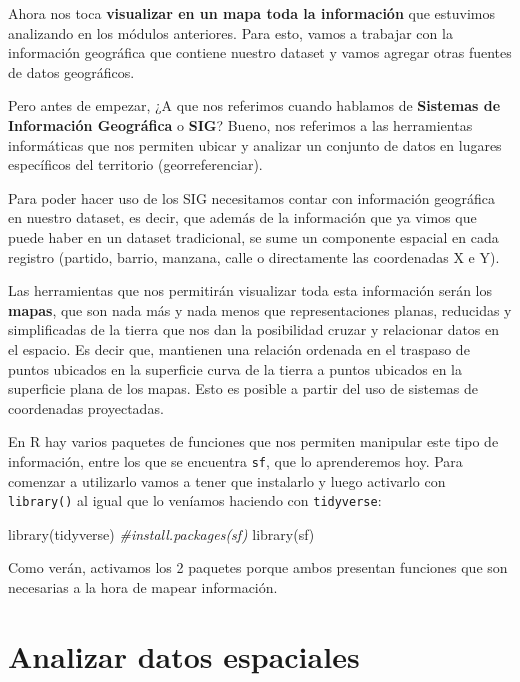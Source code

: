 \documentclass[
  spanish,
]{book}
\newenvironment{Shaded}{\begin{snugshade}}{\end{snugshade}}
\newcommand{\CommentTok}[1]{\textcolor[rgb]{0.56,0.35,0.01}{\textit{#1}}}
\newcommand{\FunctionTok}[1]{\textcolor[rgb]{0.00,0.00,0.00}{#1}}
\newcommand{\NormalTok}[1]{#1}
\begin{document}
Ahora nos toca \textbf{visualizar en un mapa toda la información} que estuvimos analizando en los módulos anteriores. Para esto, vamos a trabajar con la información geográfica que contiene nuestro dataset y vamos agregar otras fuentes de datos geográficos.

Pero antes de empezar, ¿A que nos referimos cuando hablamos de \textbf{Sistemas de Información Geográfica} o \textbf{SIG}? Bueno, nos referimos a las herramientas informáticas que nos permiten ubicar y analizar un conjunto de datos en lugares específicos del territorio (georreferenciar).

Para poder hacer uso de los SIG necesitamos contar con información geográfica en nuestro dataset, es decir, que además de la información que ya vimos que puede haber en un dataset tradicional, se sume un componente espacial en cada registro (partido, barrio, manzana, calle o directamente las coordenadas X e Y).

Las herramientas que nos permitirán visualizar toda esta información serán los \textbf{mapas}, que son nada más y nada menos que representaciones planas, reducidas y simplificadas de la tierra que nos dan la posibilidad cruzar y relacionar datos en el espacio. Es decir que, mantienen una relación ordenada en el traspaso de puntos ubicados en la superficie curva de la tierra a puntos ubicados en la superficie plana de los mapas. Esto es posible a partir del uso de sistemas de coordenadas proyectadas.

En R hay varios paquetes de funciones que nos permiten manipular este tipo de información, entre los que se encuentra \texttt{sf}, que lo aprenderemos hoy. Para comenzar a utilizarlo vamos a tener que instalarlo y luego activarlo con \texttt{library()} al igual que lo veníamos haciendo con \texttt{tidyverse}:

\begin{Shaded}
\begin{Highlighting}[]
\FunctionTok{library}\NormalTok{(tidyverse)}
\CommentTok{\#install.packages(sf)}
\FunctionTok{library}\NormalTok{(sf)}
\end{Highlighting}
\end{Shaded}

Como verán, activamos los 2 paquetes porque ambos presentan funciones que son necesarias a la hora de mapear información.

\hypertarget{analizar-datos-espaciales}{%
\section{Analizar datos espaciales}\label{analizar-datos-espaciales}}
\end{document}
